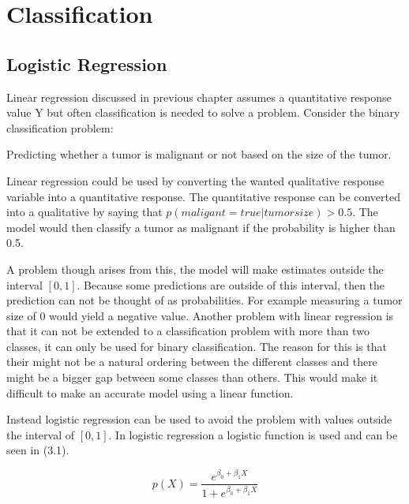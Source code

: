 \chapter{Classification}

\section{Logistic Regression}
\label{chp:logreg}
Linear regression discussed in previous chapter assumes a quantitative response value Y but often classification is needed to solve a problem. Consider the binary classification problem:
\begin{centering}
Predicting whether a tumor is malignant or not based on the size of the tumor.
\end{centering}
Linear regression could be used by converting the wanted qualitative response variable into a quantitative response. The quantitative response can be converted into a qualitative by saying that $p(maligant = true | tumorsize) > 0.5$. The model would then classify a tumor as malignant if the probability is higher than 0.5. 

A problem though arises from this, the model will make estimates outside the interval $[0,1]$. Because some predictions are outside of this interval, then the prediction can not be thought of as probabilities. For example measuring a tumor size of 0 would yield a negative value. Another problem with linear regression is that it can not be extended to a classification problem with more than two classes, it can only be used for binary classification. The reason for this is that their might not be a natural ordering between the different classes and there might be a bigger gap between some classes than others. This would make it difficult to make an accurate model using a linear function.

Instead logistic regression can be used to avoid the problem with values outside the interval of $[0,1]$. In logistic regression a logistic function is used and can be seen in (3.1).


\begin{equation}
	p(X) = \dfrac{e^{\beta_0 + \beta_1 X}}{1 + e^{\beta_0 + \beta_1 X}}
\end{equation}

